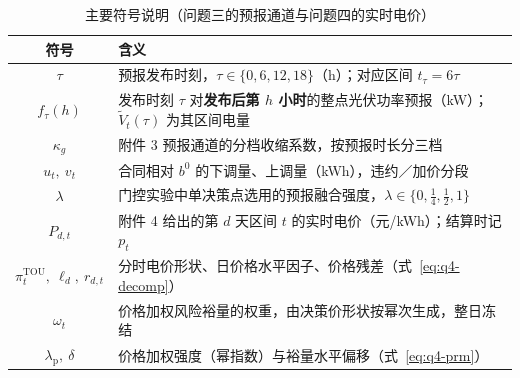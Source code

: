\begin{table}[htbp]
  \centering
  \caption{主要符号说明（问题三的预报通道与问题四的实时电价）}
  \label{tab:sym-q34}
  \small
  \begin{tabularx}{0.9\textwidth}{cX}
    \toprule
    符号 & 含义 \\
    \midrule
    $\tau$ & 预报发布时刻，$\tau\in\{0,6,12,18\}$（h）；对应区间 $t_\tau=6\tau$ \\
    $f_\tau(h)$ & 发布时刻 $\tau$ 对\textbf{发布后第 $h$ 小时}的整点光伏功率预报（kW）；$\widetilde V_t(\tau)$ 为其区间电量 \\
    $\kappa_g$ & 附件 3 预报通道的分档收缩系数，按预报时长分三档 \\
    $u_t,\ v_t$ & 合同相对 $b^{0}$ 的下调量、上调量（kWh），违约／加价分段 \\
    $\lambda$ & 门控实验中单决策点选用的预报融合强度，$\lambda\in\{0,\tfrac14,\tfrac12,1\}$ \\
    \midrule
    $P_{d,t}$ & 附件 4 给出的第 $d$ 天区间 $t$ 的实时电价（元/kWh）；结算时记 $p_t$ \\
    $\pi_t^{\mathrm{TOU}},\ \ell_d,\ r_{d,t}$ & 分时电价形状、日价格水平因子、价格残差（式~\eqref{eq:q4-decomp}） \\
    $\omega_t$ & 价格加权风险裕量的权重，由决策价形状按幂次生成，整日冻结 \\
    $\lambda_{\mathrm{p}},\ \delta$ & 价格加权强度（幂指数）与裕量水平偏移（式~\eqref{eq:q4-prm}） \\
    \bottomrule
  \end{tabularx}
\end{table}
